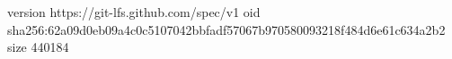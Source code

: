 version https://git-lfs.github.com/spec/v1
oid sha256:62a09d0eb09a4c0c5107042bbfadf57067b970580093218f484d6e61c634a2b2
size 440184
